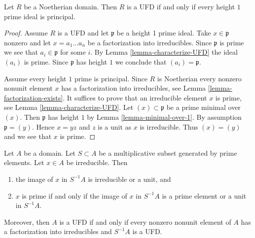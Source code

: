 \begin{lemma}
\label{lemma-characterize-UFD-height-1}
Let $R$ be a Noetherian domain. Then $R$ is a UFD if and only if every
height $1$ prime ideal is principal.
\end{lemma}

\begin{proof}
Assume $R$ is a UFD and let $\mathfrak p$ be a height 1 prime ideal.
Take $x \in \mathfrak p$ nonzero and let $x = a_1 \ldots a_n$
be a factorization into irreducibles.
Since $\mathfrak p$ is prime we see that $a_i \in \mathfrak p$
for some $i$. By Lemma \ref{lemma-characterize-UFD} the ideal
$(a_i)$ is prime. Since $\mathfrak p$ has height $1$ we conclude
that $(a_i) = \mathfrak p$.

\medskip\noindent
Assume every height $1$ prime is principal. Since $R$ is Noetherian
every nonzero nonunit element $x$ has a factorization into irreducibles,
see Lemma \ref{lemma-factorization-exists}. It suffices to prove that
an irreducible element $x$ is prime, see Lemma \ref{lemma-characterize-UFD}.
Let $(x) \subset \mathfrak p$ be a prime minimal over $(x)$. Then
$\mathfrak p$ has height $1$ by Lemma \ref{lemma-minimal-over-1}.
By assumption $\mathfrak p = (y)$. Hence $x = yz$ and $z$ is a unit
as $x$ is irreducible. Thus $(x) = (y)$ and we see that $x$ is prime.
\end{proof}

\begin{lemma}
\label{lemma-invert-prime-elements}
\begin{reference}
\cite[Lemma 2]{Nagata-UFD}
\end{reference}
Let $A$ be a domain. Let $S \subset A$ be a multiplicative subset
generated by prime elements. Let $x \in A$ be irreducible. Then
\begin{enumerate}
\item the image of $x$ in $S^{-1}A$ is irreducible or a unit, and
\item $x$ is prime if and only if the image of $x$ in $S^{-1}A$ is
a prime element or a unit in $S^{-1}A$.
\end{enumerate}
Moreover, then $A$ is a UFD if and only if every nonzero nonunit
element of $A$ has a factorization into irreducibles and $S^{-1}A$ is a UFD.
\end{lemma}

